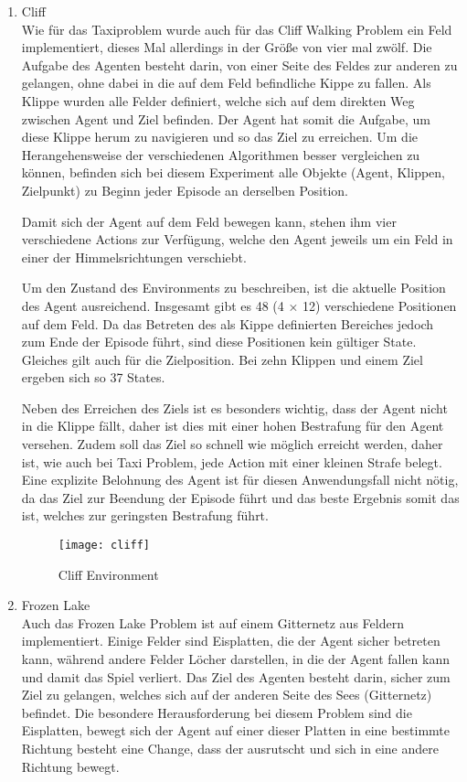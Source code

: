 \begin{enumerate}
    
    \item Cliff\\
    Wie für das Taxiproblem wurde auch für das Cliff Walking Problem ein Feld implementiert, dieses Mal allerdings in der Größe von vier mal zwölf. Die Aufgabe des Agenten besteht darin, von einer Seite des Feldes zur anderen zu gelangen, ohne dabei in die auf dem Feld befindliche Kippe zu fallen. Als Klippe wurden alle Felder definiert, welche sich auf dem direkten Weg zwischen Agent und Ziel befinden. Der Agent hat somit die Aufgabe, um diese Klippe herum zu navigieren und so das Ziel zu erreichen. Um die Herangehensweise der verschiedenen Algorithmen besser vergleichen zu können, befinden sich bei diesem Experiment alle Objekte (Agent, Klippen, Zielpunkt) zu Beginn jeder Episode an derselben Position.

    Damit sich der Agent auf dem Feld bewegen kann, stehen ihm vier verschiedene Actions zur Verfügung, welche den Agent jeweils um ein Feld in einer der Himmelsrichtungen verschiebt.

    Um den Zustand des Environments zu beschreiben, ist die aktuelle Position des Agent ausreichend. Insgesamt gibt es 48 (4 × 12) verschiedene Positionen auf dem Feld. Da das Betreten des als Kippe definierten Bereiches jedoch zum Ende der Episode führt, sind diese Positionen kein gültiger State. Gleiches gilt auch für die Zielposition. Bei zehn Klippen und einem Ziel ergeben sich so 37 States.

    Neben des Erreichen des Ziels ist es besonders wichtig, dass der Agent nicht in die Klippe fällt, daher ist dies mit einer hohen Bestrafung für den Agent versehen. Zudem soll das Ziel so schnell wie möglich erreicht werden, daher ist, wie auch bei Taxi Problem, jede Action mit einer kleinen Strafe belegt. Eine explizite Belohnung des Agent ist für diesen Anwendungsfall nicht nötig, da das Ziel zur Beendung der Episode führt und das beste Ergebnis somit das ist, welches zur geringsten Bestrafung führt.

    \begin{figure}
        \centering
        \texttt{[image: cliff]}
        \caption{Cliff Environment}
        \label{fig:cliff_env}
    \end{figure}
    
    \item Frozen Lake\\
    Auch das Frozen Lake Problem ist auf einem Gitternetz aus Feldern implementiert. Einige Felder sind Eisplatten, die der Agent sicher betreten kann, während andere Felder Löcher darstellen, in die der Agent fallen kann und damit das Spiel verliert. Das Ziel des Agenten besteht darin, sicher zum Ziel zu gelangen, welches sich auf der anderen Seite des Sees (Gitternetz) befindet. Die besondere Herausforderung bei diesem Problem sind die Eisplatten, bewegt sich der Agent auf einer dieser Platten in eine bestimmte Richtung besteht eine Change, dass der ausrutscht und sich in eine andere Richtung bewegt.


\end{enumerate}
